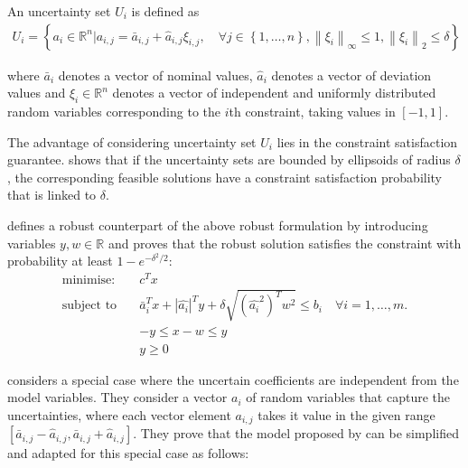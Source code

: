 An uncertainty set $U_i$ is defined as
\begingroup
\begin{align*}
U_i = \left\{a_i \in \mathbb{R}^n | a_{i,j} = \bar{a}_{i,j} + \hat{a}_{i,j} \xi_{i,j}, \quad \forall j \in \left\{1,\ldots,n\right\}, \left\|\xi_i\right\|_\infty \leq 1, \left\|\xi_i\right\|_2 \leq \delta\right\}
\end{align*}
\endgroup

\noindent where $\bar{a}_i$ denotes a vector of nominal values, $\hat{a}_i$ denotes a vector of deviation values and $\xi_i \in \mathbb{R}^n$ denotes a vector of independent and uniformly distributed random variables corresponding to the $i$th constraint, taking values in $\left[-1, 1\right]$. 

The advantage of considering uncertainty set $U_i$ lies in the constraint satisfaction guarantee. \cite{ben2000robust} shows that if the uncertainty sets are bounded by ellipsoids of radius $\delta$, the corresponding feasible solutions have a constraint satisfaction probability that is linked to $\delta$. 

\cite{babonneau2009robust} defines a robust counterpart of the above robust formulation by introducing variables $y, w \in \mathbb{R}$ and proves that the robust solution satisfies the constraint with probability at least $1-e^{-\delta^2/2}$:
\begingroup
\begin{align*}
\mbox{minimise:} \quad &c^Tx	\\
\mbox{subject to} \quad &\bar{a}_i^Tx + \left|\hat{a_i}\right|^Ty + \delta \sqrt{\left(\hat{a_i}^2\right)^T w^2}  \leq b_i  \quad \forall i = 1,\ldots,m. \\
&-y \leq x-w \leq y \\
&y \geq 0
\end{align*}
\endgroup

\cite{hijazi2013robust} considers a special case where the uncertain coefficients are independent from the model variables. They consider a vector $a_i$ of random variables that capture the uncertainties, where each vector element $a_{i,j}$ takes it value in the given range $\left[\bar{a}_{i,j} - \hat{a}_{i,j}, \bar{a}_{i,j} + \hat{a}_{i,j}\right]$. %
They prove that the model proposed by \cite{babonneau2009robust} can be simplified and adapted for this special case as follows:

